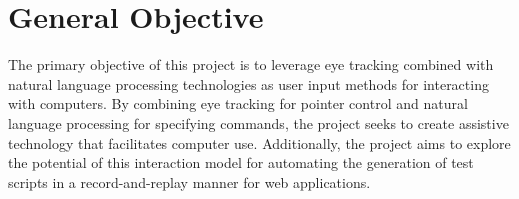 \section{General Objective}


The primary objective of this project is to leverage eye tracking combined with natural language processing technologies as user input methods for interacting with computers. By combining eye tracking for pointer control and natural language processing for specifying commands, the project seeks to create assistive technology that facilitates computer use. Additionally, the project aims to explore the potential of this interaction model for automating the generation of test scripts in a record-and-replay manner for web applications.

